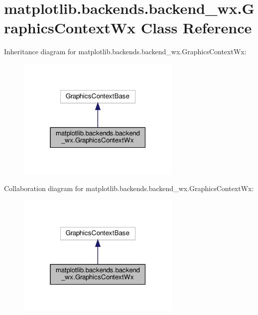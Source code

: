 \hypertarget{classmatplotlib_1_1backends_1_1backend__wx_1_1GraphicsContextWx}{}\section{matplotlib.\+backends.\+backend\+\_\+wx.\+Graphics\+Context\+Wx Class Reference}
\label{classmatplotlib_1_1backends_1_1backend__wx_1_1GraphicsContextWx}


Inheritance diagram for matplotlib.\+backends.\+backend\+\_\+wx.\+Graphics\+Context\+Wx\+:
\nopagebreak
\begin{figure}[H]
\begin{center}
\leavevmode
\includegraphics[width=223pt]{classmatplotlib_1_1backends_1_1backend__wx_1_1GraphicsContextWx__inherit__graph}
\end{center}
\end{figure}


Collaboration diagram for matplotlib.\+backends.\+backend\+\_\+wx.\+Graphics\+Context\+Wx\+:
\nopagebreak
\begin{figure}[H]
\begin{center}
\leavevmode
\includegraphics[width=223pt]{classmatplotlib_1_1backends_1_1backend__wx_1_1GraphicsContextWx__coll__graph}
\end{center}
\end{figure}
